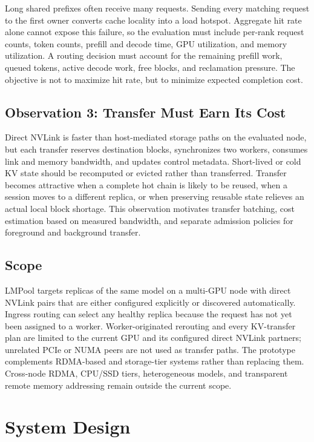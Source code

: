\documentclass{article}
\newcommand{\sys}{LMPool}
\begin{document}
Long shared prefixes often receive many requests. Sending every matching request to the first owner converts cache locality into a load hotspot. Aggregate hit rate alone cannot expose this failure, so the evaluation must include per-rank request counts, token counts, prefill and decode time, GPU utilization, and memory utilization. A routing decision must account for the remaining prefill work, queued tokens, active decode work, free blocks, and reclamation pressure. The objective is not to maximize hit rate, but to minimize expected completion cost.

\subsection{Observation 3: Transfer Must Earn Its Cost}

Direct NVLink is faster than host-mediated storage paths on the evaluated node, but each transfer reserves destination blocks, synchronizes two workers, consumes link and memory bandwidth, and updates control metadata. Short-lived or cold KV state should be recomputed or evicted rather than transferred. Transfer becomes attractive when a complete hot chain is likely to be reused, when a session moves to a different replica, or when preserving reusable state relieves an actual local block shortage. This observation motivates transfer batching, cost estimation based on measured bandwidth, and separate admission policies for foreground and background transfer.

\subsection{Scope}

\sys{} targets replicas of the same model on a multi-GPU node with direct NVLink pairs that are either configured explicitly or discovered automatically. Ingress routing can select any healthy replica because the request has not yet been assigned to a worker. Worker-originated rerouting and every KV-transfer plan are limited to the current GPU and its configured direct NVLink partners; unrelated PCIe or NUMA peers are not used as transfer paths. The prototype complements RDMA-based and storage-tier systems rather than replacing them. Cross-node RDMA, CPU/SSD tiers, heterogeneous models, and transparent remote memory addressing remain outside the current scope.

\section{System Design}
\label{sec:design}
\end{document}
